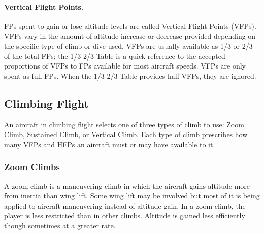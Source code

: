 \paragraph{Vertical Flight Points.} FPs spent to gain or lose altitude levels are called Vertical Flight Points (VFPs). VFPs vary in the amount of altitude increase or decrease provided depending on the specific type of climb or dive used. VFPs are usually available as 1/3 or 2/3 of the total FPs; the 1/3-2/3 Table is a quick reference to the accepted proportions of VFPs to FPs available for most aircraft speeds. VFPs are only spent as full FPs. When the 1/3-2/3 Table provides half VFPs, they are ignored. 

\subsection{Climbing Flight}

An aircraft in climbing flight selects one of three types of climb to use: Zoom Climb, Sustained Climb, or Vertical Climb. Each type of climb prescribes how many VFPs and HFPs an aircraft must or may have available to it.

\subsubsection{Zoom Climbs}

A zoom climb is a maneuvering climb in which the aircraft gains altitude more from inertia than wing lift. Some wing lift may be involved but most of it is being applied to aircraft maneuvering instead of altitude gain. In a zoom climb, the player is less restricted than in other climbs. Altitude is gained less efficiently though sometimes at a greater rate.


